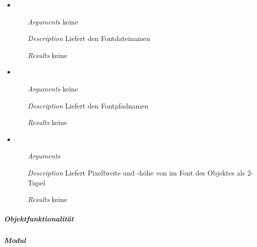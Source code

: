 \begin{itemize}
\item {}
\begin{enumerate}
\item[\textit{Arguments}] keine
\item[\textit{Description}] Liefert den Fontdateinamen
\item[\textit{Results}] keine
\end{enumerate}

\item {}
\begin{enumerate}
\item[\textit{Arguments}] keine
\item[\textit{Description}] Liefert den Fontpfadnamen
\item[\textit{Results}] keine
\end{enumerate}

\item {}
\begin{enumerate}
\item[\textit{Arguments}] 
\item[\textit{Description}] Liefert Pixelbreite und -h\"ohe
von  im Font des Objektes als 2-Tupel
\item[\textit{Results}] keine
\end{enumerate}

\end{itemize}


\newpage

\subparagraph{Objektfunktionalit\"at}


\newpage

\paragraph{}

\subparagraph{Modul} 


